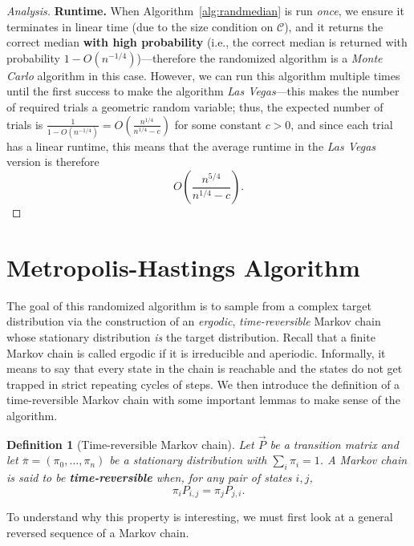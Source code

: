 \documentclass[12pt,a4paper]{article}
\newtheorem{definition}{Definition}
\newenvironment{analysis}[1][Analysis]%
{\begin{proof}[#1]}%
	{\end{proof}}
\begin{document}
\begin{analysis}
		\textbf{Runtime.} When Algorithm~\ref{alg:randmedian} is run \emph{once}, we ensure it terminates in linear time (due to the size condition on \(\mathcal{C}\)), and it returns the correct median \textbf{with high probability} (i.e., the correct median is returned with probability \(1-O(n^{-1/4})\))---therefore the randomized algorithm is a \emph{Monte Carlo} algorithm in this case. However, we can run this algorithm multiple times until the first success to make the algorithm \emph{Las Vegas}---this makes the number of required trials a geometric random variable; thus, the expected number of trials is \(\frac{1}{1-O(n^{-1/4})} = O\!\left(\frac{n^{1/4}}{n^{1/4}-c}\right)\) for some constant \(c>0\), and since each trial has a linear runtime, this means that the average runtime in the \emph{Las Vegas} version is therefore
		\[
		O\!\left(\frac{n^{5/4}}{n^{1/4}-c}\right).
		\]
		
	\end{analysis}
	
	\section{Metropolis-Hastings Algorithm}
	The goal of this randomized algorithm is to sample from a complex target distribution via the construction of an \emph{ergodic}, \emph{time-reversible} Markov chain whose stationary distribution \emph{is} the target distribution. Recall that a finite Markov chain is called ergodic if it is irreducible and aperiodic. Informally, it means to say that every state in the chain is reachable and the states do not get trapped in strict repeating cycles of steps.
	We then introduce the definition of a time-reversible Markov chain with some important lemmas to make sense of the algorithm.
	
	\begin{definition}[Time-reversible Markov chain]
		Let \(\vec{P}\) be a transition matrix and let \(\overline{\pi} = (\pi_0,\dots,\pi_n)\) be a stationary distribution with \(\sum_i \pi_i=1\). A Markov chain is said to be \textbf{time-reversible} when, for any pair of states \(i,j\),
		\[
		\pi_i P_{i,j} = \pi_j P_{j,i}.
		\]
		\label{time-reversible}
	\end{definition}
	
	To understand why this property is interesting, we must first look at a general reversed sequence of a Markov chain.
	
\end{document}
